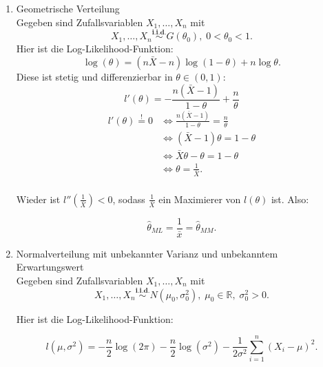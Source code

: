 \documentclass[10pt]{article}
\newcommand{\FZV}{X_1, \ldots, X_n} %
\newcommand{\IR}{\mathbb{R}} %
\newenvironment{BSP}[1][]
{\begin{Beispiel}[frametitle=#1]}{\end{Beispiel}}
\begin{document}
\begin{BSP}[Beispiel 1.3.8 (Maximum-Likelihood)]
\begin{enumerate}[label = (\roman*)]
			
			\item Geometrische Verteilung \\
			Gegeben sind Zufallsvariablen $\FZV$ mit
			\begin{equation*}
				\FZV \overset{\textbf{i.i.d.}}{\sim} G(\theta_0), \; 0 < \theta_0 < 1.
			\end{equation*} 
			Hier ist die Log-Likelihood-Funktion: 
			\begin{equation*}
				\log(\theta)= (n\bar{X}-n)\log(1-\theta)+ n\log\theta.
			\end{equation*}
			Diese ist stetig und differenzierbar in $\theta \in (0,1)$:
			\begin{equation*}
				l'(\theta) = - \frac{n(\bar{X}-1)}{1-\theta} + \frac{n}{\theta}
			\end{equation*}
			\begin{equation*}
				\begin{split}
					l'(\theta) \overset{!}{=} 0 &\Leftrightarrow \frac{n (\bar{X}-1)}{1-\theta} = \frac{n}{\theta}\\
					&\Leftrightarrow (\bar{X}-1) \theta = 1-\theta\\
					&\Leftrightarrow \bar{X} \theta - \theta = 1-\theta\\
					&\Leftrightarrow \theta = \frac{1}{\bar{X}}.\\
				\end{split}
			\end{equation*}
			
			Wieder ist $l''(\frac{1}{\bar{X}}) <0$, sodass $\frac{1}{\bar{X}}$ ein Maximierer von $l(\theta)$ ist. Also:
			
			\begin{equation*}
				\hat{\theta}_{ML} = \frac{1}{\bar{x}} = \hat{\theta}_{MM}.
			\end{equation*} 
			
			\item Normalverteilung mit unbekannter Varianz und unbekanntem Erwartungswert\\
			Gegeben sind Zufallsvariablen $\FZV$ mit
			\begin{equation*}
				\FZV \overset{\textbf{i.i.d.}} {\sim} N(\mu_0,\sigma_0^2),\; \mu_0 \in \IR, \; \sigma_0^2 >0. 
			\end{equation*}
			
			Hier ist die Log-Likelihood-Funktion:
			
			\begin{equation*}
				l(\mu, \sigma^2) = -\frac{n}{2}\log(2\pi) - \frac{n}{2}\log(\sigma^2)-\frac{1}{2\sigma^2}\sum_{i=1}^{n}(X_i-\mu)^2.
			\end{equation*}
			

\end{enumerate}
\end{BSP}
\end{document}
